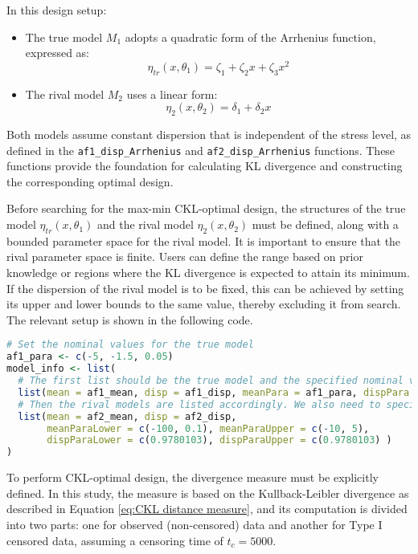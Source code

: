 In this design setup:

\begin{itemize}
\item The true model $M_1$ adopts a quadratic form of the Arrhenius function, expressed as:
$$\eta_{tr}(x,\theta_1)=\zeta_1+\zeta_2x+\zeta_3x^2$$

\item The rival model $M_2$ uses a linear form:
$$\eta_2(x,\theta_2)=\delta_1+\delta_2x$$
\end{itemize}

\hspace*{8mm} Both models assume constant dispersion that is independent of the stress level, as defined in the \verb|af1_disp_Arrhenius| and \verb|af2_disp_Arrhenius| functions. These functions provide the foundation for calculating KL divergence and constructing the corresponding optimal design.

\hspace*{8mm} Before searching for the max-min CKL-optimal design, the structures of the true model $\eta_{tr}(x,\theta_1)$ and the rival model $\eta_2(x,\theta_2)$ must be defined, along with a bounded parameter space for the rival model. It is important to ensure that the rival parameter space is finite. Users can define the range based on prior knowledge or regions where the KL divergence is expected to attain its minimum. If the dispersion of the rival model is to be fixed, this can be achieved by setting its upper and lower bounds to the same value, thereby excluding it from search. The relevant setup is shown in the following code.

\begin{lstlisting}[language=R, caption={Setting Model Parameters}]
# Set the nominal values for the true model
af1_para <- c(-5, -1.5, 0.05)
model_info <- list(
  # The first list should be the true model and the specified nominal values
  list(mean = af1_mean, disp = af1_disp, meanPara = af1_para, dispPara = 0.9780103),
  # Then the rival models are listed accordingly. We also need to specify the model space.
  list(mean = af2_mean, disp = af2_disp,
       meanParaLower = c(-100, 0.1), meanParaUpper = c(-10, 5),
       dispParaLower = c(0.9780103), dispParaUpper = c(0.9780103) )
)
\end{lstlisting}

\hspace*{8mm} To perform CKL-optimal design, the divergence measure must be explicitly defined. In this study, the measure is based on the Kullback-Leibler divergence as described in Equation \eqref{eq:CKL distance measure}, and its computation is divided into two parts: one for observed (non-censored) data and another for Type I censored data, assuming a censoring time of $t_c = 5000$.

